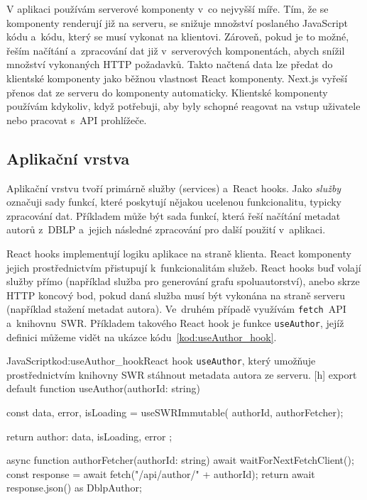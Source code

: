 \documentclass[
  biblatex,
  sourcecodes,
  glossaries,
  index
]{kidiplom}
\begin{document}
V aplikaci používám serverové komponenty v~co nejvyšší míře. Tím, že se komponenty renderují již na serveru, se snižuje množství poslaného JavaScript kódu a~kódu, který se musí vykonat na klientovi. Zároveň, pokud je to možné, řeším načítání a~zpracování dat již v~serverových komponentách, abych snížil množství vykonaných HTTP požadavků. Takto načtená data lze předat do klientské komponenty jako běžnou vlastnost React komponenty. Next.js vyřeší přenos dat ze serveru do komponenty automaticky. Klientské komponenty používám kdykoliv, když potřebuji, aby byly schopné reagovat na vstup uživatele nebo pracovat s~API prohlížeče.

\subsection{Aplikační vrstva}

Aplikační vrstvu tvoří primárně služby (services) a~React hooks. Jako \textit{služby} označuji sady funkcí, které poskytují nějakou ucelenou funkcionalitu, typicky zpracování dat. Příkladem může být sada funkcí, která řeší načítání metadat autorů z~DBLP a~jejich následné zpracování pro další použití v~aplikaci.

React hooks implementují logiku aplikace na straně klienta. React komponenty jejich prostřednictvím přistupují k~funkcionalitám služeb. React hooks buď volají služby přímo (například služba pro generování grafu spoluautorství), anebo skrze HTTP koncový bod, pokud daná služba musí být vykonána na straně serveru (například stažení metadat autora). Ve~druhém případě využívám \texttt{fetch}~API a~knihovnu~SWR. Příkladem takového React hook je funkce \texttt{useAuthor}, jejíž definici můžeme vidět na ukázce kódu~\ref{kod:useAuthor_hook}.

\begin{kicode}{JavaScript}{kod:useAuthor_hook}{React hook \texttt{useAuthor}, který umožňuje prostřednictvím knihovny SWR stáhnout metadata autora ze serveru.} [h]
export default function useAuthor(authorId: string) {
    const { data, error, isLoading } = useSWRImmutable(
        authorId,
        authorFetcher);

    return {
        author: data,
        isLoading,
        error
    };
}

async function authorFetcher(authorId: string) {
    await waitForNextFetchClient();
    const response = await fetch("/api/author/" + authorId);
    return await response.json() as DblpAuthor;
}
\end{kicode}
\end{document}
